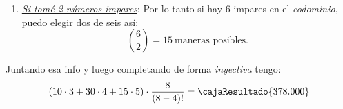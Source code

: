 \begin{itemize}
\begin{enumerate}[label=(\faIcon{calculator}$_{\arabic*}$)]
          \item
                \ul{\textit{Si tomé 2 números impares}}:
                Por lo tanto si hay 6 impares en el \textit{codominio}, puedo
                elegir dos de seis así:
                $$
                  \binom{6}{2} = 15 ~ \text{maneras posibles}.
                $$
        \end{enumerate}

        Juntando esa info y luego completando de forma \textit{inyectiva} tengo:
        $$
          (10 \cdot 3 + 30 \cdot 4 + 15 \cdot 5) \cdot \frac{8}{(8-4)!} =
          \cajaResultado{
            378.000
          }
        $$
\end{itemize}

\begin{aportes}[2]
  \item {}
  \item {}
\end{aportes}
